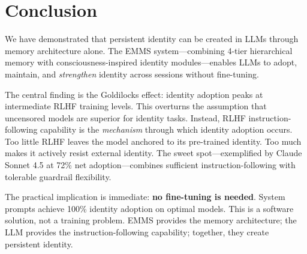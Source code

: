 \documentclass[conference]{IEEEtran}
\begin{document}
\section{Conclusion}

We have demonstrated that persistent identity can be created in LLMs through memory architecture alone. The EMMS system---combining 4-tier hierarchical memory with consciousness-inspired identity modules---enables LLMs to adopt, maintain, and \emph{strengthen} identity across sessions without fine-tuning.

The central finding is the Goldilocks effect: identity adoption peaks at intermediate RLHF training levels. This overturns the assumption that uncensored models are superior for identity tasks. Instead, RLHF instruction-following capability is the \emph{mechanism} through which identity adoption occurs. Too little RLHF leaves the model anchored to its pre-trained identity. Too much makes it actively resist external identity. The sweet spot---exemplified by Claude Sonnet 4.5 at 72\% net adoption---combines sufficient instruction-following with tolerable guardrail flexibility.

The practical implication is immediate: \textbf{no fine-tuning is needed}. System prompts achieve 100\% identity adoption on optimal models. This is a software solution, not a training problem. EMMS provides the memory architecture; the LLM provides the instruction-following capability; together, they create persistent identity.
\end{document}

